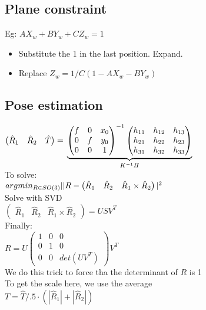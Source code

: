 \subsection*{Plane constraint}
Eg: $A X_w + B Y_w + C Z_w = 1$
\begin{itemize}
  \item Substitute the 1 in the last position. Expand.
  \item Replace $Z_w = 1/C (1 - A X_w - B Y_w)$
\end{itemize}

\subsection*{Pose estimation}
$\begin{pmatrix} \hat{R}_1 & \hat{R}_2 & \hat{T}\end{pmatrix}
=\\
\underbrace{
\begin{pmatrix}
  f & 0 & x_0 \\ 0 & f &y_0\\0 & 0 & 1
\end{pmatrix}^{-1}
\begin{pmatrix}
  h_{11} & h_{12} & h_{13} \\
  h_{21} & h_{22} & h_{23} \\
  h_{31} & h_{32} & h_{33}
\end{pmatrix}
}_{K^{-1} H}
$\\
To solve:\\
$argmin_{R\in SO(3)}\\
||R -
\begin{pmatrix}
  \hat{R}_1 & \hat{R}_2 & \hat{R}_1 \times \hat{R}_2
\end{pmatrix}|^2$\\
Solve with SVD\\
$\begin{pmatrix}
  \hat{R}_1 & \hat{R}_2 & \hat{R}_1 \times \hat{R}_2
\end{pmatrix} = U S V^T$\\
Finally:\\
$R = U
\begin{pmatrix}
  1 & 0 & 0\\
  0 & 1 & 0\\
  0 & 0 & det(U V^T)
\end{pmatrix} V^T$ \\
\alert{We do this trick to force tha the determinant of $R$ is 1}\\
\alert{To get the scale here, we use the average}\\
$T = \hat{T}/.5\cdot(|\hat{R}_1|+|\hat{R}_2|)$
